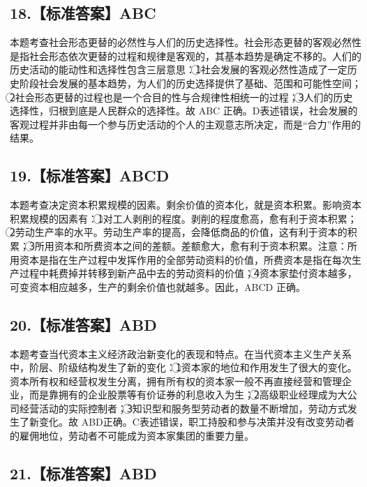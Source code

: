 \documentclass[UTF8,11pt]{ctexart}
\begin{document}
\subsection*{18.【标准答案】ABC}

本题考查社会形态更替的必然性与人们的历史选择性。社会形态更替的客观必然性是指社会形态依次更替的过程和规律是客观的，其基本趋势是确定不移的。人们的历史活动的能动性和选择性包含三层意思：\textcircled{1}社会发展的客观必然性造成了一定历史阶段社会发展的基本趋势，为人们的历史选择提供了基础、范围和可能性空间；\textcircled{2}社会形态更替的过程也是一个合目的性与合规律性相统一的过程；\textcircled{3}人们的历史选择性，归根到底是人民群众的选择性。故 ABC 正确。D表述错误，社会发展的客观过程并非由每一个参与历史活动的个人的主观意志所决定，而是“合力”作用的结果。


\subsection*{19.【标准答案】ABCD}

本题考查决定资本积累规模的因素。剩余价值的资本化，就是资本积累。影响资本积累规模的因素有：\textcircled{1}对工人剥削的程度。剥削的程度愈高，愈有利于资本积累；\textcircled{2}劳动生产率的水平。劳动生产率的提高，会降低商品的价值，这有利于资本的积累；\textcircled{3}所用资本和所费资本之间的差额。差额愈大，愈有利于资本积累。注意：所用资本是指在生产过程中发挥作用的全部劳动资料的价值，所费资本是指在每次生产过程中耗费掉并转移到新产品中去的劳动资料的价值；\textcircled{4}资本家垫付资本越多，可变资本相应越多，生产的剩余价值也就越多。因此，ABCD 正确。


\subsection*{20.【标准答案】ABD}

本题考查当代资本主义经济政治新变化的表现和特点。在当代资本主义生产关系中，阶层、阶级结构发生了新的变化：\textcircled{1}资本家的地位和作用发生了很大的变化。资本所有权和经营权发生分离，拥有所有权的资本家一般不再直接经营和管理企业，而是靠拥有的企业股票等有价证券的利息收入为生；\textcircled{2}高级职业经理成为大公司经营活动的实际控制者；\textcircled{3}知识型和服务型劳动者的数量不断增加，劳动方式发生了新变化。故 ABD正确。C表述错误，职工持股和参与决策并没有改变劳动者的雇佣地位，劳动者不可能成为资本家集团的重要力量。


\subsection*{21.【标准答案】ABD}
\end{document}
